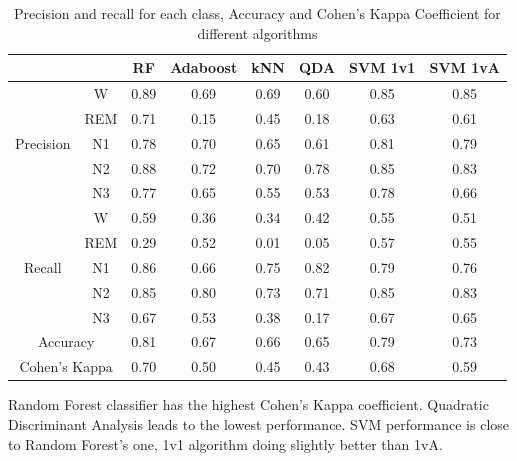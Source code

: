 \documentclass[12pt]{report}
\begin{document}
\begin{table}[H]
\centering
\begin{tabular}{lc|cccccc}
\multicolumn{1}{l|}{}          & \multicolumn{1}{l|}{} & RF   & Adaboost & kNN  & QDA  & SVM 1v1 & SVM 1vA \\ \hline
\multicolumn{1}{l|}{}          & W                     & 0.89 & 0.69     & 0.69 & 0.60 & 0.85    & 0.85    \\
\multicolumn{1}{c|}{\textbf{}} & REM                   & 0.71 & 0.15     & 0.45 & 0.18 & 0.63    & 0.61    \\
\multicolumn{1}{c|}{Precision} & N1                    & 0.78 & 0.70     & 0.65 & 0.61 & 0.81    & 0.79    \\
\multicolumn{1}{l|}{}          & N2                    & 0.88 & 0.72     & 0.70 & 0.78 & 0.85    & 0.83    \\
\multicolumn{1}{l|}{}          & N3                    & 0.77 & 0.65     & 0.55 & 0.53 & 0.78    & 0.66    \\ \hline
\multicolumn{1}{l|}{}          & W                     & 0.59 & 0.36     & 0.34 & 0.42 & 0.55    & 0.51    \\
\multicolumn{1}{l|}{}          & REM                   & 0.29 & 0.52     & 0.01 & 0.05 & 0.57    & 0.55    \\
\multicolumn{1}{c|}{Recall}    & N1                    & 0.86 & 0.66     & 0.75 & 0.82 & 0.79    & 0.76    \\
\multicolumn{1}{l|}{}          & N2                    & 0.85 & 0.80     & 0.73 & 0.71 & 0.85    & 0.83    \\
\multicolumn{1}{l|}{}          & N3                    & 0.67 & 0.53     & 0.38 & 0.17 & 0.67    & 0.65    \\ \hline
\multicolumn{2}{c}{Accuracy}                           & 0.81 & 0.67     & 0.66 & 0.65 & 0.79    & 0.73    \\ \hline
\multicolumn{2}{c}{Cohen's Kappa}                      & 0.70 & 0.50     & 0.45 & 0.43 & 0.68    & 0.59   
\end{tabular}
\caption{\label{tab:algo_res}Precision and recall for each class, Accuracy and Cohen's Kappa Coefficient for different algorithms}
\end{table}

Random Forest classifier has the highest Cohen's Kappa coefficient. Quadratic Discriminant Analysis leads to the lowest performance. SVM performance is close to Random Forest's one, 1v1 algorithm doing slightly better than 1vA.
\end{document}

